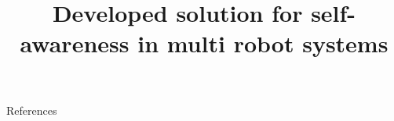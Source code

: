 \documentclass{beamer}
\title{Developed solution for self-awareness in multi robot systems}
\date{}
\renewcommand{\[}{\begingroup\small\OriginalDisplayMathOpen}
\renewcommand{\]}{\OriginalDisplayMathClose\endgroup}
\begin{document}
    
    \frame{\titlepage}
    
    
    
    
    
    
    
    
    
    
    
    
    
    
    
    
    
    
    
    
    
    
    \begin{frame}[allowframebreaks]{References}
        \tiny
        
        
    \end{frame}
\end{document}
